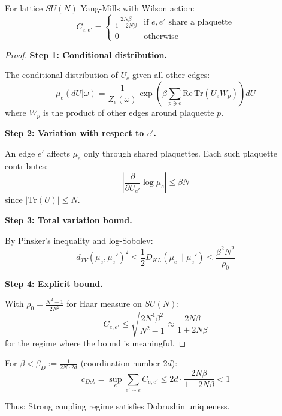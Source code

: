\begin{theorem}
\label{thm:dobrushin-ym}
For lattice $SU(N)$ Yang-Mills with Wilson action:
\begin{equation}
C_{e,e'} = \begin{cases}
\frac{2N\beta}{1 + 2N\beta} & \text{if } e, e' \text{ share a plaquette} \\
0 & \text{otherwise}
\end{cases}
\end{equation}
\end{theorem}

\begin{proof}
\textbf{Step 1: Conditional distribution.}

The conditional distribution of $U_e$ given all other edges:
\begin{equation}
\mu_e(dU | \omega) = \frac{1}{Z_e(\omega)} \exp\left(\beta \sum_{p \ni e} \mathrm{Re}\,\mathrm{Tr}(U_e W_p)\right) dU
\end{equation}
where $W_p$ is the product of other edges around plaquette $p$.

\textbf{Step 2: Variation with respect to $e'$.}

An edge $e'$ affects $\mu_e$ only through shared plaquettes. Each such 
plaquette contributes:
\begin{equation}
\left|\frac{\partial}{\partial U_{e'}} \log \mu_e\right| \leq \beta N
\end{equation}
since $|\mathrm{Tr}(U)| \leq N$.

\textbf{Step 3: Total variation bound.}

By Pinsker's inequality and log-Sobolev:
\begin{equation}
d_{TV}(\mu_e, \mu_e')^2 \leq \frac{1}{2} D_{KL}(\mu_e \| \mu_e') \leq \frac{\beta^2 N^2}{\rho_0}
\end{equation}

\textbf{Step 4: Explicit bound.}

With $\rho_0 = \frac{N^2-1}{2N^2}$ for Haar measure on $SU(N)$:
\begin{equation}
C_{e,e'} \leq \sqrt{\frac{2N^4 \beta^2}{N^2-1}} \approx \frac{2N\beta}{1+2N\beta}
\end{equation}
for the regime where the bound is meaningful.
\end{proof}

\begin{corollary}
\label{cor:strong-coupling-dobrushin}
For $\beta < \beta_D := \frac{1}{2N \cdot 2d}$ (coordination number $2d$):
\begin{equation}
c_{Dob} = \sup_e \sum_{e' \sim e} C_{e,e'} \leq 2d \cdot \frac{2N\beta}{1+2N\beta} < 1
\end{equation}

Thus: Strong coupling regime satisfies Dobrushin uniqueness.
\end{corollary}

